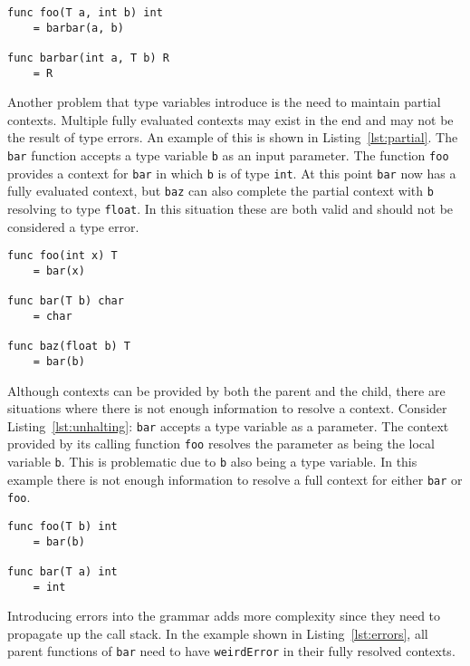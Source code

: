 \documentclass{acm_proc_article-sp}
\begin{document}
\begin{lstlisting}[caption=Explicit context provided by child and parent,language=Paratype,label=lst:cbyboth]
func foo(T a, int b) int
    = barbar(a, b)

func barbar(int a, T b) R
    = R
\end{lstlisting}

Another problem that type variables introduce is the need to maintain partial
contexts. Multiple fully evaluated contexts may exist in the end and may not be
the result of type errors. An example of this is shown in
Listing~\ref{lst:partial}. The \lstinline!bar! function accepts a type variable
\lstinline!b! as an input parameter. The function \lstinline!foo! provides a
context for \lstinline!bar! in which \lstinline!b! is of type \lstinline!int!.
At this point \lstinline!bar! now has a fully evaluated context, but
\lstinline!baz! can also complete the partial context with \lstinline!b!
resolving to type \lstinline!float!.  In this situation these are both valid
and should not be considered a type error.

\begin{lstlisting}[caption=Need to maintain partial contexts,language=Paratype,label=lst:partial]
func foo(int x) T
    = bar(x)

func bar(T b) char
    = char

func baz(float b) T
    = bar(b)
\end{lstlisting}

Although contexts can be provided by both the parent and the child, there are
situations where there is not enough information to resolve a context. Consider
Listing~\ref{lst:unhalting}: \lstinline!bar! accepts a type variable as a
parameter. The context provided by its calling function \lstinline!foo!
resolves the parameter as being the local variable \lstinline!b!. This is
problematic due to \lstinline!b! also being a type variable. In this example
there is not enough information to resolve a full context for either
\lstinline!bar! or \lstinline!foo!.

\begin{lstlisting}[caption=Unhalting context resolution,language=Paratype,label=lst:unhalting]
func foo(T b) int
    = bar(b)

func bar(T a) int
    = int
\end{lstlisting}

Introducing errors into the grammar adds more complexity since they need to
propagate up the call stack. In the example shown in Listing~\ref{lst:errors},
all parent functions of \lstinline!bar! need to have \lstinline!weirdError! in
their fully resolved contexts.
\end{document}
